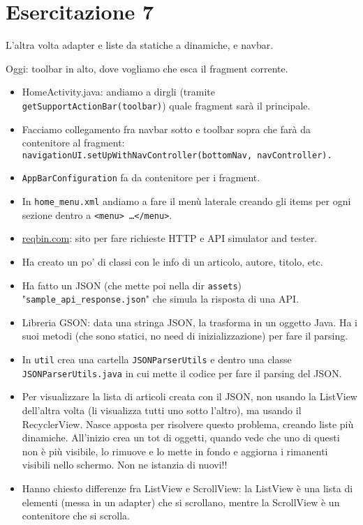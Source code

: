 
\chapter{Esercitazione 7}
\par L'altra volta adapter e liste da statiche a dinamiche, e navbar.
\par Oggi: toolbar in alto, dove vogliamo che esca il fragment corrente.
\begin{itemize}
    \item HomeActivity.java: andiamo a dirgli (tramite \texttt{getSupportActionBar(toolbar)}) quale fragment sarà il principale.
    \item Facciamo collegamento fra navbar sotto e toolbar sopra che farà da contenitore al fragment: \texttt{navigationUI.setUpWithNavController(bottomNav, navController).}
    \item \texttt{AppBarConfiguration} fa da contenitore per i fragment.
    \item In \texttt{home\_menu.xml} andiamo a fare il menù laterale creando gli items per ogni sezione dentro a \texttt{<menu> \dots </menu>}.
    \item \url{reqbin.com}: sito per fare richieste HTTP e API simulator and tester.
    \item Ha creato un po' di classi con le info di un articolo, autore, titolo, etc. 
    \item Ha fatto un JSON (che mette poi nella dir \texttt{assets}) "\texttt{sample\_api\_response.json}" che simula la risposta di una API.
    \item Libreria GSON: data una stringa JSON, la trasforma in un oggetto Java. Ha i suoi metodi (che sono statici, no need di inizializzazione) per fare il parsing.
    \item In \texttt{util} crea una cartella \texttt{JSONParserUtils} e dentro una classe \texttt{JSONParserUtils.java} in cui mette il codice per fare il parsing del JSON. 
    \item Per visualizzare la lista di articoli creata con il JSON, non usando la ListView dell'altra volta (li visualizza tutti uno sotto l'altro), ma usando il RecyclerView. Nasce apposta per risolvere questo problema, creando liste più dinamiche. All'inizio crea un tot di oggetti, quando vede che uno di questi non è più visibile, lo rimuove e lo mette in fondo e aggiorna i rimanenti visibili nello schermo. Non ne istanzia di nuovi!!
    \item Hanno chiesto differenze fra ListView e ScrollView: la ListView è una lista di elementi (messa in un adapter) che si scrollano, mentre la ScrollView è un contenitore che si scrolla.

\end{itemize}
